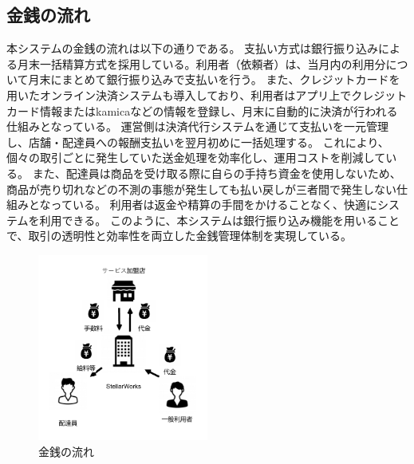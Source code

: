 \subsection{金銭の流れ}
本システムの金銭の流れは以下の通りである。
支払い方式は銀行振り込みによる月末一括精算方式を採用している。利用者（依頼者）は、当月内の利用分について月末にまとめて銀行振り込みで支払いを行う。
また、クレジットカードを用いたオンライン決済システムも導入しており、利用者はアプリ上でクレジットカード情報またはkamicaなどの情報を登録し、月末に自動的に決済が行われる仕組みとなっている。
運営側は決済代行システムを通じて支払いを一元管理し、店舗・配達員への報酬支払いを翌月初めに一括処理する。
これにより、個々の取引ごとに発生していた送金処理を効率化し、運用コストを削減している。
また、配達員は商品を受け取る際に自らの手持ち資金を使用しないため、商品が売り切れなどの不測の事態が発生しても払い戻しが三者間で発生しない仕組みとなっている。
利用者は返金や精算の手間をかけることなく、快適にシステムを利用できる。
このように、本システムは銀行振り込み機能を用いることで、取引の透明性と効率性を両立した金銭管理体制を実現している。
\begin{figure}[H]
  \centering
  \includegraphics[width=0.5\textwidth]{お金の流れ1.pdf}
  \caption{金銭の流れ}
  \label{money}
\end{figure}
